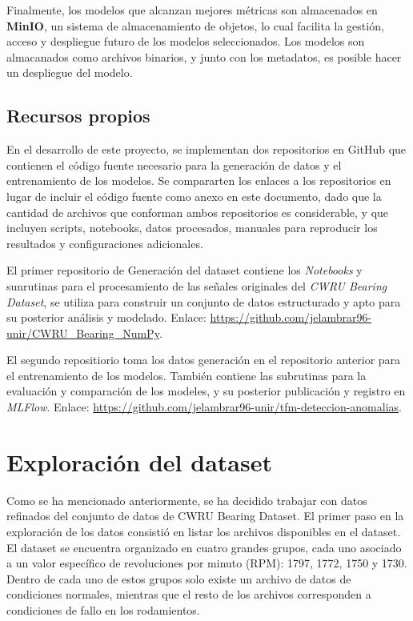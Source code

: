 \documentclass[11pt,a4paper,spanish]{book}
\numberwithin{equation}{chapter}
\numberwithin{figure}{chapter}
\begin{document}
Finalmente, los modelos que alcanzan mejores métricas son almacenados en \textbf{MinIO},
un sistema de almacenamiento de objetos, lo cual facilita la gestión, acceso y despliegue 
futuro de los modelos seleccionados. Los modelos son almacanados como archivos binarios, y
junto con los metadatos, es posible hacer un despliegue del modelo. 


\subsection{Recursos propios}


En el desarrollo de este proyecto, se implementan dos repositorios en GitHub que 
contienen el código fuente necesario para la generación de datos y el entrenamiento de 
los modelos. 
Se compararten los enlaces a los repositorios en lugar de incluir el código fuente como 
anexo en este documento, dado que la cantidad de archivos que conforman ambos repositorios
es considerable, y que incluyen scripts, notebooks, datos procesados, manuales para 
reproducir los resultados y configuraciones adicionales.


El primer repositorio de Generación del dataset contiene los 
\textit{Notebooks} y sunrutinas para el 
procesamiento de las señales originales del \textit{CWRU Bearing Dataset}, 
se utiliza para construir un conjunto de datos estructurado y apto para su posterior 
análisis y modelado. Enlace: 
\href{https://github.com/jelambrar96-unir/CWRU_Bearing_NumPy}
{https://github.com/jelambrar96-unir/CWRU\_Bearing\_NumPy}.


El segundo repositiorio toma los datos generación en el repositorio anterior para el entrenamiento
de los modelos. También contiene las subrutinas para la evaluación y comparación de los modeles, 
y su posterior publicación y registro en \textit{MLFlow}. Enlace:
\href{https://github.com/jelambrar96-unir/tfm-deteccion-anomalias}
{https://github.com/jelambrar96-unir/tfm-deteccion-anomalias}.


\section{Exploración del dataset}


Como se ha mencionado anteriormente, se ha decidido trabajar con datos refinados del 
conjunto de datos de CWRU Bearing Dataset. El primer paso en la exploración de los datos
consistió en listar los archivos disponibles en el dataset. El dataset se encuentra 
organizado en cuatro grandes grupos, cada uno asociado a un valor específico de 
revoluciones por minuto (RPM): 1797, 1772, 1750 y 1730. Dentro de cada uno de estos 
grupos solo existe un archivo de datos de condiciones normales, mientras que el resto de
los archivos corresponden a condiciones de fallo en los rodamientos.
\end{document}
